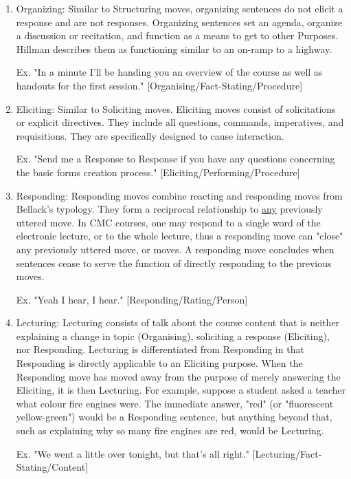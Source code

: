 \documentclass[10pt, letterpaper]{article}
\begin{document}
\begin{enumerate}
\item Organizing: Similar to Structuring moves, organizing sentences do not
elicit a response and are not responses. Organizing sentences set an
agenda, organize a discussion or recitation, and function as a means to
get to other Purposes. Hillman describes them as functioning similar to an
on-ramp to a highway.

Ex. "In a minute I'll be handing you an overview of the course as well as
handouts for the first session." [Organising/Fact-Stating/Procedure]

\item Eliciting: Similar to Soliciting moves. Eliciting moves consist of
solicitations or explicit directives. They include all questions,
commands, imperatives, and requisitions. They are specifically designed to
cause interaction.

Ex. "Send me a Response to Response if you have any questions concerning
the basic forms creation process." [Eliciting/Performing/Procedure]

\item Responding: Responding moves combine reacting and responding moves from
Bellack's typology. They form a reciprocal relationship to \uline{any}
previously uttered move. In CMC courses, one may respond to a single word
of the electronic lecture, or to the whole lecture, thus a responding move
can "close" any previously uttered move, or moves. A responding move
concludes when sentences cease to serve the function of directly
responding to the previous moves.

Ex. "Yeah I hear, I hear." [Responding/Rating/Person]

\item Lecturing: Lecturing consists of talk about the course content that is
neither explaining a change in topic (Organising), soliciting a response
(Eliciting), nor Responding. Lecturing is differentiated from Responding
in that Responding is directly applicable to an Eliciting purpose. When
the Responding move has moved away from the purpose of merely answering
the Eliciting, it is then Lecturing. For example, suppose a student asked
a teacher what colour fire engines were. The immediate answer, "red" (or
"fluorescent yellow-green") would be a Responding sentence, but anything
beyond that, such as explaining why so many fire engines are red, would be
Lecturing.

Ex. "We went a little over tonight, but that's all right."
[Lecturing/Fact-Stating/Content]


\end{enumerate}
\end{document}

